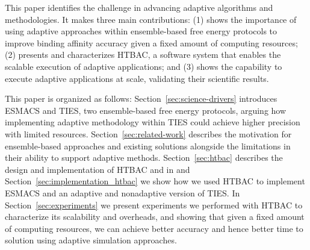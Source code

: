 
This paper identifies the challenge in advancing adaptive algorithms and
methodologies.  It makes three main contributions: (1) shows the importance of using
adaptive approaches within ensemble-based free energy protocols to improve
binding affinity accuracy given a fixed amount of computing resources; (2)
presents and characterizes HTBAC, a software system that enables the scalable
execution of adaptive applications; and (3) shows the capability to execute
adaptive applications at scale, validating their scientific results.




This paper is organized as follows: Section~\ref{sec:science-drivers}
introduces ESMACS and TIES, two ensemble-based free energy protocols, arguing
how implementing adaptive methodology within TIES could achieve higher
precision with limited resources. Section~\ref{sec:related-work} describes
the motivation for ensemble-based approaches and existing solutions alongside
the limitations in their ability to support adaptive methods.
Section~\ref{sec:htbac} describes the design and implementation of HTBAC and
in and Section~\ref{sec:implementation_htbac} we show how we used HTBAC to
implement ESMACS and an adaptive and nonadaptive version of TIES. In
Section~\ref{sec:experiments} we present experiments we performed with HTBAC
to characterize its scalability and overheads, and showing that given a fixed
amount of computing resources, we can achieve better accuracy and hence
better time to solution using adaptive simulation approaches.